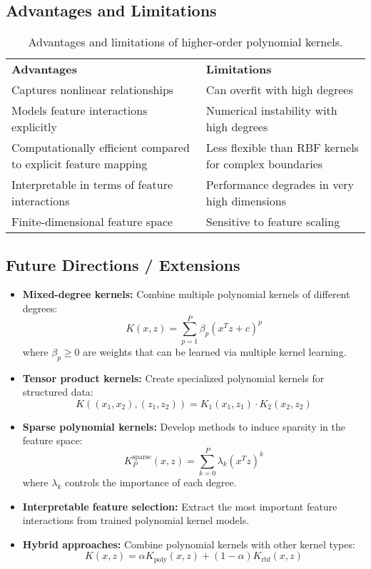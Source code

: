 \documentclass[11pt]{article}
\begin{document}
\subsection{Advantages and Limitations}
\begin{table}[h]
  \centering
  \begin{tabular}{p{}p{}}
    \textbf{Advantages} & \textbf{Limitations} \\
    Captures nonlinear relationships & Can overfit with high degrees \\
    Models feature interactions explicitly & Numerical instability with high degrees \\
    Computationally efficient compared to explicit feature mapping & Less flexible than RBF kernels for complex boundaries \\
    Interpretable in terms of feature interactions & Performance degrades in very high dimensions \\
    Finite-dimensional feature space & Sensitive to feature scaling \\
  \end{tabular}
  \caption{Advantages and limitations of higher-order polynomial kernels.}
\end{table}

\subsection{Future Directions / Extensions}
\begin{itemize}
  \item \textbf{Mixed-degree kernels:} Combine multiple polynomial kernels of different degrees:
    \[
    K(x,z) = \sum_{p=1}^P \beta_p (x^Tz + c)^p
    \]
    where $\beta_p \geq 0$ are weights that can be learned via multiple kernel learning.
  
  \item \textbf{Tensor product kernels:} Create specialized polynomial kernels for structured data:
    \[
    K((x_1,x_2), (z_1,z_2)) = K_1(x_1,z_1) \cdot K_2(x_2,z_2)
    \]
    
  \item \textbf{Sparse polynomial kernels:} Develop methods to induce sparsity in the feature space:
    \[
    K_P^{\text{sparse}}(x,z) = \sum_{k=0}^P \lambda_k (x^Tz)^k
    \]
    where $\lambda_k$ controls the importance of each degree.
    
  \item \textbf{Interpretable feature selection:} Extract the most important feature interactions from trained polynomial kernel models.
  
  \item \textbf{Hybrid approaches:} Combine polynomial kernels with other kernel types:
    \[
    K(x,z) = \alpha K_{\text{poly}}(x,z) + (1-\alpha)K_{\text{rbf}}(x,z)
    \]
\end{itemize}
\end{document}
